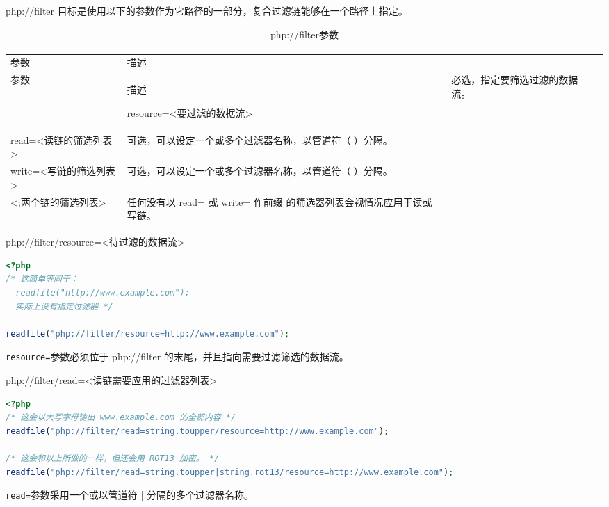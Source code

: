 php://filter 目标是使用以下的参数作为它路径的一部分，复合过滤链能够在一个路径上指定。



\begin{longtable}{|m{100pt}|m{150pt}|}
\tabularnewline\hline
参数&描述
\endhead

\caption{php://filter参数}\\
\hline
参数&描述
\endfirsthead

\endfoot

\endlastfoot
\hline
resource=<要过滤的数据流>	&必选，指定要筛选过滤的数据流。\\
\hline
read=<读链的筛选列表>	 &可选，可以设定一个或多个过滤器名称，以管道符（|）分隔。\\
\hline
write=<写链的筛选列表>	&可选，可以设定一个或多个过滤器名称，以管道符（|）分隔。\\
\hline
<;两个链的筛选列表>	&任何没有以 read= 或 write= 作前缀 的筛选器列表会视情况应用于读或写链。\\
\hline
\end{longtable}



\begin{example}
php://filter/resource=<待过滤的数据流>
\begin{lstlisting}[language=PHP]
<?php
/* 这简单等同于：
  readfile("http://www.example.com");
  实际上没有指定过滤器 */

readfile("php://filter/resource=http://www.example.com");
\end{lstlisting}
\end{example}


\texttt{resource=}参数必须位于 php://filter 的末尾，并且指向需要过滤筛选的数据流。

\begin{example}
php://filter/read=<读链需要应用的过滤器列表>
\begin{lstlisting}[language=PHP]
<?php
/* 这会以大写字母输出 www.example.com 的全部内容 */
readfile("php://filter/read=string.toupper/resource=http://www.example.com");

/* 这会和以上所做的一样，但还会用 ROT13 加密。 */
readfile("php://filter/read=string.toupper|string.rot13/resource=http://www.example.com");
\end{lstlisting}
\end{example}

\texttt{read=}参数采用一个或以管道符 | 分隔的多个过滤器名称。

